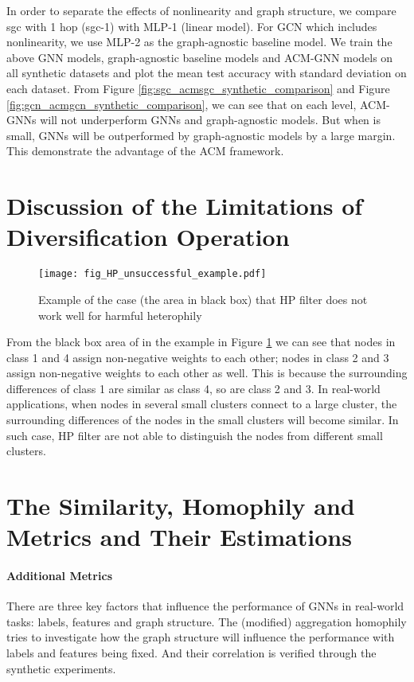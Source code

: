 \documentclass{article}
\newcommand{\0}{{\boldsymbol{0}}}
\newcommand{\6}{{\partial}}
\newcommand{\8}{{\infty}}
\newcommand{\4}{{\nabla}}
\begin{document}
In order to separate the effects of nonlinearity and graph structure, we compare sgc with 1 hop (sgc-1) with MLP-1 (linear model). For GCN which includes nonlinearity, we use MLP-2 as the graph-agnostic baseline model. We train the above GNN models, graph-agnostic baseline models and ACM-GNN models on all synthetic datasets and plot the mean test accuracy with standard deviation on each dataset. From Figure \ref{fig:sgc_acmsgc_synthetic_comparison} and Figure \ref{fig:gcn_acmgcn_synthetic_comparison}, we can see that on each  level, ACM-GNNs will not underperform GNNs and graph-agnostic models. But when  is small, GNNs will be outperformed by graph-agnostic models by a large margin. This demonstrate the advantage of the ACM framework.

\section{Discussion of the Limitations of Diversification Operation}
\label{appendix:limitation_diversification}
\begin{figure}[htbp]
\centering
{
\captionsetup{justification = centering}
\texttt{[image: fig\_HP\_unsuccessful\_example.pdf]}}
{\caption{Example of the case (the area in black box) that HP filter does not work well for harmful heterophily}\label{fig:unsuccessful_example_hp_filter}
}
\end{figure}
From the black box area of  in the example in Figure \ref{fig:unsuccessful_example_hp_filter} we can see that nodes in class 1 and 4 assign non-negative weights to each other; nodes in class 2 and 3 assign non-negative weights to each other as well. This is because the surrounding differences of class 1 are similar as class 4, so are class 2 and 3. In real-world applications, when nodes in several small clusters connect to a large cluster, the surrounding differences of the nodes in the small clusters will become similar. In such case, HP filter are not able to distinguish the nodes from different small clusters. 

\section{The Similarity, Homophily and  Metrics and Their Estimations}
\label{appendix:estimation_similarity_homophily_diversification_metrics}
\paragraph{Additional Metrics}
There are three key factors that influence the performance of GNNs in real-world tasks: labels, features and graph structure. The (modified) aggregation homophily tries to investigate how the graph structure will influence the performance with labels and features being fixed. And their correlation is verified through the synthetic experiments. 
\end{document}
